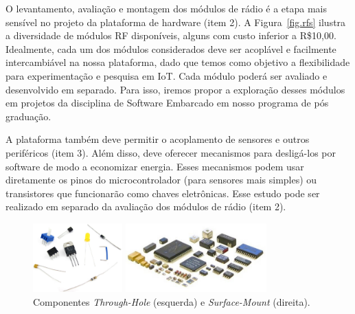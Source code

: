 \documentclass[titlepage,12pt]{article}
\begin{document}
O levantamento, avaliação e montagem dos módulos de rádio é a etapa mais
sensível no projeto da plataforma de hardware (item 2).
%
A Figura~\ref{fig.rfs} ilustra a diversidade de módulos RF disponíveis, alguns
com custo inferior a R\$10,00.
%
Idealmente, cada um dos módulos considerados deve ser acoplável e facilmente
intercambiável na nossa plataforma, dado que temos como objetivo a
flexibilidade para experimentação e pesquisa em IoT.
%
Cada módulo poderá ser avaliado e desenvolvido em separado.
Para isso, iremos propor a exploração desses módulos em projetos da disciplina
de Software Embarcado em nosso programa de pós graduação.


A plataforma também deve permitir o acoplamento de sensores e outros
periféricos (item 3).
%
Além disso, deve oferecer mecanismos para desligá-los por software de modo a
economizar energia.
%
Esses mecanismos podem usar diretamente os pinos do microcontrolador (para
sensores mais simples) ou transistores que funcionarão como chaves eletrônicas.
%
Esse estudo pode ser realizado em separado da avaliação dos módulos de rádio
(item 2).

\begin{figure}
\begin{minipage}{0.50\textwidth}
\includegraphics[height=100px]{through-hole}
\end{minipage}
\begin{minipage}{0.50\textwidth}
\includegraphics[height=100px]{smd}
\end{minipage}
\caption{ Componentes \emph{Through-Hole} (esquerda) e \emph{Surface-Mount} (direita).
    \label{fig.mount}
}
\end{figure}
\end{document}
